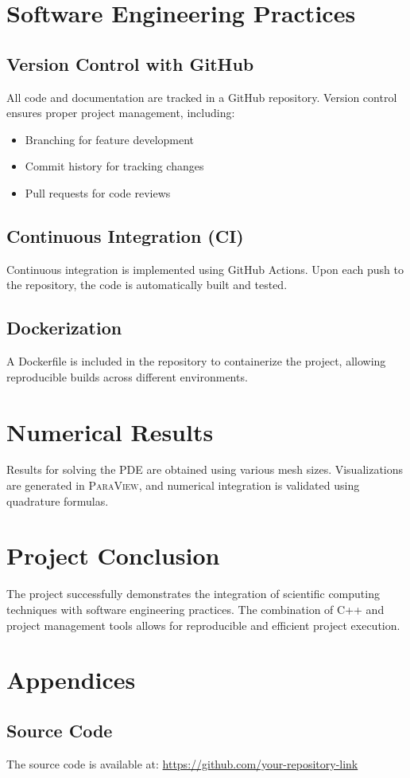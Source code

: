 \documentclass[english,10pt,a4paper]{article}
\begin{document}
\section{Software Engineering Practices}
\label{sec:software_practices}
\subsection{Version Control with GitHub}
All code and documentation are tracked in a GitHub repository. Version control ensures proper project management, including:
\begin{itemize}
    \item Branching for feature development
    \item Commit history for tracking changes
    \item Pull requests for code reviews
\end{itemize}

\subsection{Continuous Integration (CI)}
Continuous integration is implemented using GitHub Actions. Upon each push to the repository, the code is automatically built and tested.

\subsection{Dockerization}
A Dockerfile is included in the repository to containerize the project, allowing reproducible builds across different environments.

\section{Numerical Results}
\label{sec:numerical_results}
Results for solving the PDE are obtained using various mesh sizes. Visualizations are generated in \textsc{ParaView}, and numerical integration is validated using quadrature formulas.

\section{Project Conclusion}
\label{sec:conclusion}
The project successfully demonstrates the integration of scientific computing techniques with software engineering practices. The combination of C++ and project management tools allows for reproducible and efficient project execution.

\section*{Appendices}
\subsection*{Source Code}
The source code is available at: \url{https://github.com/your-repository-link}
\end{document}
